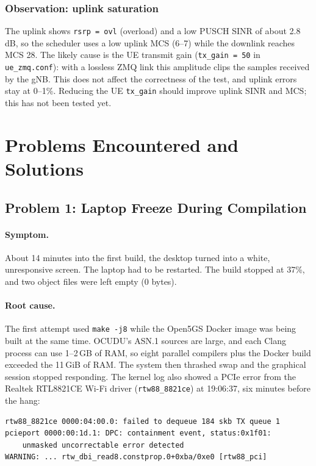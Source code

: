 \documentclass[11pt,a4paper]{article}
\newcommand{\fpath}[1]{\texttt{#1}}
\begin{document}
\subsubsection*{Observation: uplink saturation}
The uplink shows \texttt{rsrp = ovl} (overload) and a low PUSCH SINR of about
2.8\,dB, so the scheduler uses a low uplink MCS (6--7) while the downlink reaches
MCS 28. The likely cause is the UE transmit gain (\texttt{tx\_gain = 50} in
\fpath{ue\_zmq.conf}): with a lossless ZMQ link this amplitude clips the samples
received by the gNB. This does not affect the correctness of the test, and
uplink errors stay at 0--1\%. Reducing the UE \texttt{tx\_gain} should improve
uplink SINR and MCS; this has not been tested yet.

\section{Problems Encountered and Solutions}

\subsection{Problem 1: Laptop Freeze During Compilation}
\label{sec:p1}

\paragraph{Symptom.} About 14 minutes into the first build, the desktop turned
into a white, unresponsive screen. The laptop had to be restarted. The build
stopped at 37\%, and two object files were left empty (0 bytes).

\paragraph{Root cause.} The first attempt used \texttt{make -j8} while the
Open5GS Docker image was being built at the same time. OCUDU's ASN.1 sources
are large, and each Clang process can use 1--2\,GB of RAM, so eight parallel
compilers plus the Docker build exceeded the 11\,GiB of RAM. The system then
thrashed swap and the graphical session stopped responding. The kernel log
also showed a PCIe error from the Realtek RTL8821CE Wi-Fi driver
(\texttt{rtw88\_8821ce}) at 19:06:37, six minutes before the hang:
\begin{lstlisting}
rtw88_8821ce 0000:04:00.0: failed to dequeue 184 skb TX queue 1
pcieport 0000:00:1d.1: DPC: containment event, status:0x1f01:
    unmasked uncorrectable error detected
WARNING: ... rtw_dbi_read8.constprop.0+0xba/0xe0 [rtw88_pci]
\end{lstlisting}
\end{document}
